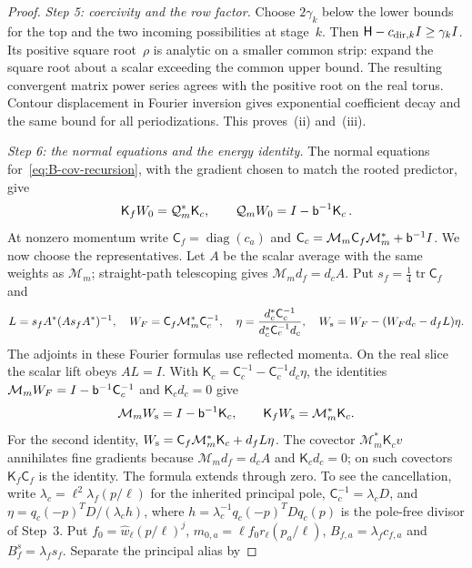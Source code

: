 \begin{proof}
\emph{Step 5: coercivity and the row factor.} Choose $2\gamma_k$ below the lower bounds for the top and the two incoming possibilities at stage~$k$. Then $\mathsf H-c_{{\rm dir},k}I\ge\gamma_kI$. Its positive square root~$\rho$ is analytic on a smaller common strip: expand the square root about a scalar exceeding the common upper bound. The resulting convergent matrix power series agrees with the positive root on the real torus. Contour displacement in Fourier inversion gives exponential coefficient decay and the same bound for all periodizations. This proves~(ii) and~(iii).

\emph{Step 6: the normal equations and the energy identity.} The normal equations for~\eqref{eq:B-cov-recursion}, with the gradient chosen to match the rooted predictor, give
\begin{equation*}
\mathsf K_fW_0=\mathcal Q_m^*\mathsf K_c,\qquad
\mathcal Q_mW_0=I-\mathsf{b}^{-1}\mathsf K_c\,.
\end{equation*}
At nonzero momentum write $\mathsf C_f=\operatorname{diag}(c_a)$ and $\mathsf C_c=\mathcal M_m\mathsf C_f\mathcal M_m^*+\mathsf{b}^{-1}I$. We now choose the representatives. Let $A$ be the scalar average with the same weights as $\mathcal M_m$; straight-path telescoping gives $\mathcal M_m d_f=d_cA$. Put $s_f=\tfrac14\operatorname{tr}\mathsf C_f$ and
\begin{equation*}
L=s_fA^*(As_fA^*)^{-1},\quad
W_F=\mathsf C_f\mathcal M_m^*\mathsf C_c^{-1},\quad
\eta=\frac{d_c^*\mathsf C_c^{-1}}{d_c^*\mathsf C_c^{-1}d_c},\quad
W_{\rm s}=W_F-(W_Fd_c-d_fL)\eta.
\end{equation*}
The adjoints in these Fourier formulas use reflected momenta. On the real slice the scalar lift obeys $AL=I$. With $\mathsf K_c=\mathsf C_c^{-1}-\mathsf C_c^{-1}d_c\eta$, the identities $\mathcal M_mW_F=I-\mathsf{b}^{-1}\mathsf C_c^{-1}$ and $\mathsf K_cd_c=0$ give
\begin{equation}\label{eq:B-centred-normal}
\mathcal M_mW_{\rm s}=I-\mathsf{b}^{-1}\mathsf K_c,\qquad
\mathsf K_fW_{\rm s}=\mathcal M_m^*\mathsf K_c.
\end{equation}
For the second identity, $W_{\rm s}=\mathsf C_f\mathcal M_m^*\mathsf K_c+d_fL\eta$. The covector $\mathcal M_m^*\mathsf K_c v$ annihilates fine gradients because $\mathcal M_md_f=d_cA$ and $\mathsf K_cd_c=0$; on such covectors $\mathsf K_f\mathsf C_f$ is the identity. The formula extends through zero. To see the cancellation, write $\lambda_c=\ell^2\lambda_f(p/\ell)$ for the inherited principal pole, $\mathsf C_c^{-1}=\lambda_cD$, and $\eta=q_c(-p)^TD/(\lambda_c h)$, where $h=\lambda_c^{-1}q_c(-p)^TDq_c(p)$ is the pole-free divisor of Step~3. Put $f_0=\widehat w_\ell(p/\ell)^j$, $m_{0,a}=\ell f_0r_\ell(p_a/\ell)$, $B_{f,a}=\lambda_fc_{f,a}$ and $B_f^s=\lambda_fs_f$. Separate the principal alias by

\end{proof}
